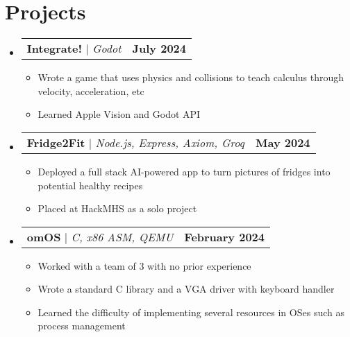 \documentclass[letterpaper,11pt]{article}
\makeatletter
\newcommand{\resumeItem}[1]{
  \item\small{
    {#1 \vspace{-2pt}}
  }
}
\newcommand{\resumeProjectHeading}[2]{
    \item
    \begin{tabular*}{1.001\textwidth}{l@{\extracolsep{\fill}}r}
      \small#1 & \textbf{\small #2}\\
    \end{tabular*}\vspace{-7pt}
}
\newcommand{\resumeSubHeadingListStart}{\begin{itemize}[leftmargin=0.0in, label={}]}
\newcommand{\resumeSubHeadingListEnd}{\end{itemize}}
\newcommand{\resumeItemListStart}{\begin{itemize}}
\newcommand{\resumeItemListEnd}{\end{itemize}\vspace{-5pt}}
\makeatother
\begin{document}
\section{Projects}
   \vspace{-5pt}
   \resumeSubHeadingListStart
     \resumeProjectHeading
         {\textbf{Integrate!} $|$ \emph{Godot}}{July 2024}
         \resumeItemListStart
            \resumeItem{Wrote a game that uses physics and collisions to teach calculus through velocity, acceleration, etc}
            \resumeItem{Learned Apple Vision and Godot API}
         \resumeItemListEnd
         \vspace{-13pt}
     \resumeProjectHeading
         {\textbf{Fridge2Fit} $|$ \emph{Node.js, Express, Axiom, Groq}}{May 2024}
         \resumeItemListStart
            \resumeItem{Deployed a full stack AI-powered app to turn pictures of fridges into potential healthy recipes}
            \resumeItem{Placed at HackMHS as a solo project}
         \resumeItemListEnd 
         \vspace{-13pt}
         \resumeProjectHeading
         {\textbf{omOS} $|$ \emph{C, x86 ASM, QEMU}}{February 2024}
         \resumeItemListStart
            \resumeItem{Worked with a team of 3 with no prior experience}
            \resumeItem{Wrote a standard C library and a VGA driver with keyboard handler}
            \resumeItem{Learned the difficulty of implementing several resources in OSes such as process management}
         \resumeItemListEnd 
   \resumeSubHeadingListEnd
\vspace{-15pt}
\end{document}
